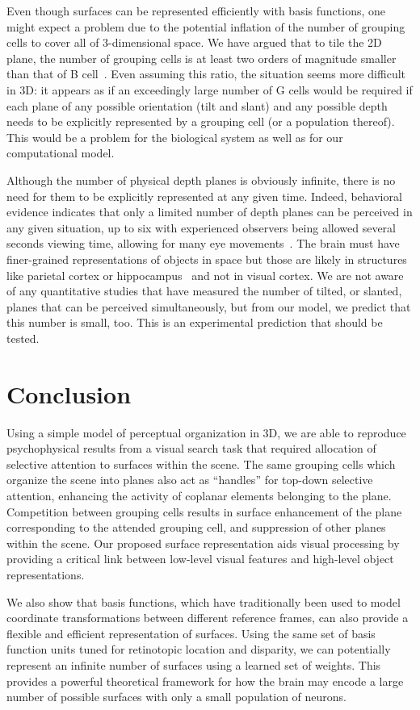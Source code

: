 Even though surfaces can be represented efficiently with basis functions, one might expect a problem due to the potential inflation of the number of grouping cells to cover all of 3-dimensional space. We have argued that to tile the 2D plane, the number of grouping cells is at least two orders of magnitude smaller than that of B cell~\citep{Craft_etal07}. Even assuming this ratio, the situation seems more difficult in 3D: it appears as if an exceedingly large number of G cells would be required if each plane of any possible orientation (tilt and slant) and any possible depth needs to be explicitly represented by a grouping cell (or a population thereof). This would be a problem for the biological system as well as for our computational model.

Although the number of physical depth planes is obviously infinite, there is no need for them to be explicitly represented at any given time. Indeed, behavioral evidence indicates that only a limited number of depth planes can be perceived in any given situation, up to six with experienced observers being allowed several seconds viewing time, allowing for many eye movements~\citep{Tsirlin_etal08}. The brain must have finer-grained representations of objects in space but those are likely in structures like parietal cortex or hippocampus~\citep{Manns_Eichenbaum09,Deshmukh_Knierim13} and not in visual cortex. We are not aware of any quantitative studies that have measured the number of tilted, or slanted, planes that can be perceived simultaneously, but from our model, we predict that this number is small, too. This is an experimental prediction that should be tested.

\section{Conclusion}

Using a simple model of perceptual organization in 3D,  we are able to reproduce psychophysical results from a visual search task that required allocation of selective attention to surfaces within the scene. The same grouping cells which organize the scene into planes also act as ``handles'' for top-down selective attention, enhancing the activity of coplanar elements belonging to the plane. Competition between grouping cells results in surface enhancement of the plane corresponding to the attended grouping cell, and suppression of other planes within the scene. Our proposed surface representation aids visual processing by providing a critical link between low-level visual features and high-level object representations.

We also show that basis functions, which have traditionally been used to model coordinate transformations between different reference frames, can also provide a flexible and efficient representation of surfaces. Using the same set of basis function units tuned for retinotopic location and disparity, we can potentially represent an infinite number of surfaces using a learned set of weights. This provides a powerful theoretical framework for how the brain may encode a large number of possible surfaces with only a small population of neurons.

